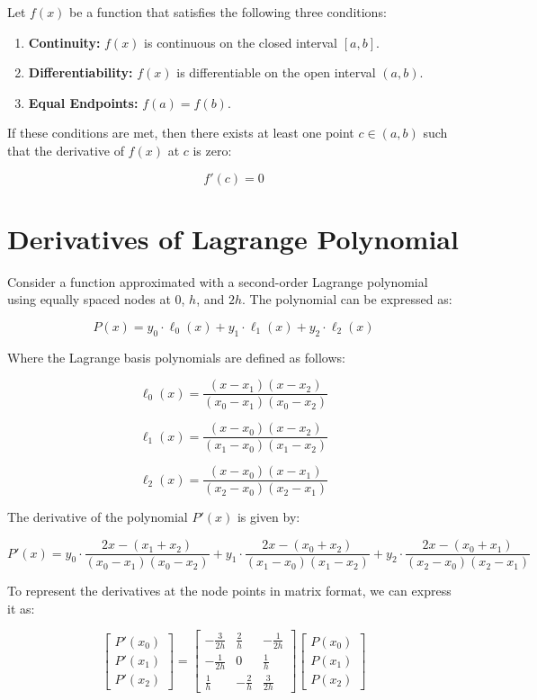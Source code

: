 \documentclass[12pt]{report} %
\begin{document}
Let \( f(x) \) be a function that satisfies the following three conditions:
\begin{enumerate}
    \item \textbf{Continuity:} \( f(x) \) is continuous on the closed interval \([a, b]\).
    \item \textbf{Differentiability:} \( f(x) \) is differentiable on the open interval \((a, b)\).
    \item \textbf{Equal Endpoints:} \( f(a) = f(b) \).
\end{enumerate}

If these conditions are met, then there exists at least one point \( c \in (a, b) \) such that the derivative of \( f(x) \) at \( c \) is zero:

\[
f'(c) = 0
\]

\section{Derivatives of Lagrange Polynomial}
Consider a function approximated with a second-order Lagrange polynomial using equally spaced nodes at \(0\), \(h\), and \(2h\). The polynomial can be expressed as:

\[
P(x) = y_0 \cdot \ell_0(x) + y_1 \cdot \ell_1(x) + y_2 \cdot \ell_2(x)
\]

Where the Lagrange basis polynomials are defined as follows:

\[
\ell_0(x) = \frac{(x - x_1)(x - x_2)}{(x_0 - x_1)(x_0 - x_2)}
\]

\[
\ell_1(x) = \frac{(x - x_0)(x - x_2)}{(x_1 - x_0)(x_1 - x_2)}
\]

\[
\ell_2(x) = \frac{(x - x_0)(x - x_1)}{(x_2 - x_0)(x_2 - x_1)}
\]

The derivative of the polynomial \( P'(x) \) is given by:

\[
P'(x) = y_0 \cdot \frac{2x - (x_1 + x_2)}{(x_0 - x_1)(x_0 - x_2)} + y_1 \cdot \frac{2x - (x_0 + x_2)}{(x_1 - x_0)(x_1 - x_2)} + y_2 \cdot \frac{2x - (x_0 + x_1)}{(x_2 - x_0)(x_2 - x_1)}
\]

To represent the derivatives at the node points in matrix format, we can express it as:

\[
\begin{bmatrix}
P'(x_0) \\
P'(x_1) \\
P'(x_2)
\end{bmatrix} =
\begin{bmatrix}
-\frac{3}{2h} & \frac{2}{h} & -\frac{1}{2h} \\
-\frac{1}{2h} & 0 & \frac{1}{h} \\
\frac{1}{h} & -\frac{2}{h} & \frac{3}{2h}
\end{bmatrix}
\begin{bmatrix}
P(x_0) \\
P(x_1) \\
P(x_2)
\end{bmatrix}
\]
\end{document}
